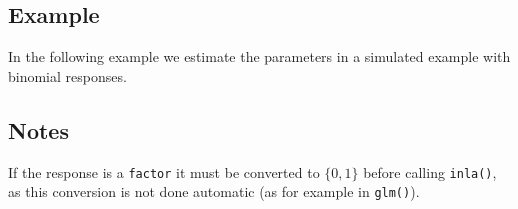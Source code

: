 \documentclass[a4paper,11pt]{article}
\begin{document}
\subsection*{Example}

In the following example we estimate the parameters in a simulated
example with binomial responses.


\subsection*{Notes}

If the response is a \verb|factor| it must be converted to $\{0,1\}$
before calling \verb|inla()|, as this conversion is not done automatic
(as for example in \verb|glm()|).
\end{document}
